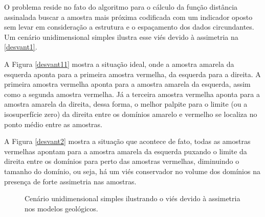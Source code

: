 O problema reside no fato do algoritmo para o cálculo da função distância assinalada buscar a amostra mais próxima codificada com um indicador oposto sem levar em consideração a estrutura e o espaçamento dos dados circundantes. Um cenário unidimensional simples ilustra esse viés devido à assimetria na \autoref{desvant1}. 

A Figura \autoref{desvant11} mostra a situação ideal, onde a amostra amarela da esquerda aponta para a primeira amostra vermelha, da esquerda para a direita. A primeira amostra vermelha aponta para a amostra amarela da esquerda, assim como a segunda amostra vermelha. Já a terceira amostra vermelha aponta para a amostra amarela da direita, dessa forma, o melhor palpite para o limite (ou a isosuperfície zero) da direita entre os domínios amarelo e vermelho se localiza no ponto médio entre as amostras. 

A Figura \autoref{desvant2} mostra a situação que acontece de fato, todas as amostras vermelhas apontam para a amostra amarela da esquerda puxando o limite da direita entre os domínios para perto das amostras vermelhas, diminuindo o tamanho do domínio, ou seja, há um viés conservador no volume dos domínios na presença de forte assimetria nas amostras.

\begin{figure}[H] 
    \centering
    \caption{Cenário unidimensional simples ilustrando o viés devido à assimetria nos modelos geológicos.} \label{desvant1}
     \hspace{1em}
\end{figure}

